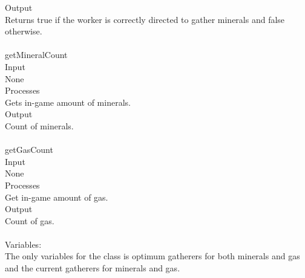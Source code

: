 \documentclass[10pt,letterpaper,onecolumn,draftclsnofoot]{IEEEtran}
\begin{document}
Output\\
Returns true if the worker is correctly directed to gather minerals and false otherwise.\\
\\
getMineralCount\\
Input\\
None\\
Processes\\
Gets in-game amount of minerals.\\
Output\\
Count of minerals.\\
\\
getGasCount\\
Input\\
None\\
Processes\\
Get in-game amount of gas.\\
Output\\
Count of gas.\\
\\
Variables:\\
The only variables for the class is optimum gatherers for both minerals and gas and the current gatherers for minerals and gas.
\end{document}
